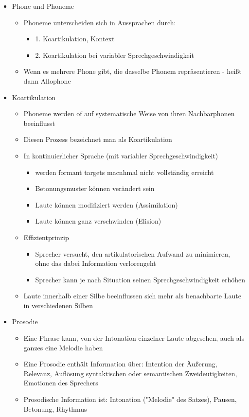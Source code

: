 \documentclass[a4paper,10pt,oneside]{article}
\begin{document}
\begin{itemize}
\begin{itemize}
			\end{itemize}
		\item Phone und Phoneme 
			\begin{itemize}
				\item Phoneme unterscheiden sich in Aussprachen durch:
					\begin{itemize}
						\item 1. Koartikulation, Kontext
						\item 2. Koartikulation bei variabler Sprechgeschwindigkeit
					\end{itemize}
				\item Wenn es mehrere Phone gibt, die dasselbe Phonem repräsentieren - heißt dann Allophone
			\end{itemize}
		\item Koartikulation
			\begin{itemize}
				\item Phoneme werden of auf systematische Weise von ihren Nachbarphonen beeinflusst
				\item Diesen Prozess bezeichnet man als Koartikulation
				\item In kontinuierlicher Sprache (mit variabler Sprechgeschwindigkeit)
					\begin{itemize}
						\item werden formant targets macnhmal nicht vollständig erreicht
						\item Betonungsmuster können verändert sein
						\item Laute können modifiziert werden (Assimilation)
						\item Laute können ganz verschwinden (Elision)
					\end{itemize}
				\item Effizientprinzip
					\begin{itemize}
						\item Sprecher versucht, den artikulatorischen Aufwand zu minimieren, ohne das dabei Information verlorengeht 
						\item Sprecher kann je nach Situation seinen Sprechgeschwindigkeit erhöhen 
					\end{itemize}
				\item Laute innerhalb einer Silbe beeinflussen sich mehr als benachbarte Laute in verschiedenen Silben
			\end{itemize}
		\item Prosodie 
			\begin{itemize}
				\item Eine Phrase kann, von der Intonation einzelner Laute abgesehen, auch als ganzes eine Melodie haben
				\item Eine Prosodie enthält Information über: Intention der Äußerung, Relevanz, Auflösung syntaktischen oder semantischen Zweideutigkeiten, Emotionen des Sprechers
				\item Prosodische Information ist: Intonation ("Melodie" des Satzes), Pausen, Betonung, Rhythmus
			\end{itemize}
	\end{itemize}
\end{document}

